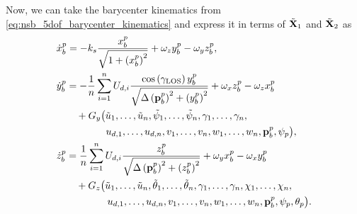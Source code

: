 Now, we can take the barycenter kinematics from \eqref{eq:nsb_5dof_barycenter_kinematics} and express it in terms of $\tilde{\mathbf{X}}_1$ and $\tilde{\mathbf{X}}_2$ as
\begin{subequations}
    \begin{align}
        &\dot{x}_b^p = -k_{s}\frac{x_b^p}{\sqrt{1+\left(x_b^p\right)^2}} + \omega_zy_b^p - \omega_yz_b^p, \label{eq:nsb_5dof_x_pb_CL} \\
        &\begin{aligned}
            \dot{y}_b^p &= - \frac{1}{n}\sum_{i=1}^n U_{d,i}{\frac{\cos\left(\gamma_{\rm LOS}\right)y_b^p}{\sqrt{\Delta\left(\mathbf{p}_b^p\right)^2 + \left(y_b^p\right)^2}}} + \omega_xz_b^p - \omega_zx_b^p \\
            & \quad + G_y\big(\tilde{u}_1, \ldots, \tilde{u}_n, \tilde{\psi}_1, \ldots, \tilde{\psi}_n, \gamma_1, \ldots, \gamma_n, \\
            & \qquad\qquad u_{d,1}, \ldots, u_{d,n}, v_1, \ldots, v_n, w_1, \ldots, w_n, \mathbf{p}_b^p, \psi_p\big),
        \end{aligned} \\
        &\begin{aligned}
            \dot{z}_b^p &= \frac{1}{n} \sum_{i=1}^n U_{d,i}\frac{z_b^p}{\sqrt{\Delta\left(\mathbf{p}_b^p\right)^2 + \left(z_b^p\right)^2}} + \omega_yx_b^p - \omega_xy_b^p \\
            & \quad + G_z\big(\tilde{u}_1, \ldots, \tilde{u}_n, \tilde{\theta}_1, \ldots, \tilde{\theta}_n, \gamma_1, \ldots, \gamma_n, \chi_1, \ldots, \chi_n, \\
            & \qquad \qquad\, u_{d,1}, \ldots, u_{d,n}, v_1, \ldots, v_n, w_1, \ldots, w_n, \mathbf{p}_b^p, \psi_p, \theta_p\big).
        \end{aligned} \label{eq:nsb_5dof_z_pb_CL}
    \end{align} \label{eq:nsb_5dof_nominal}
\end{subequations}

